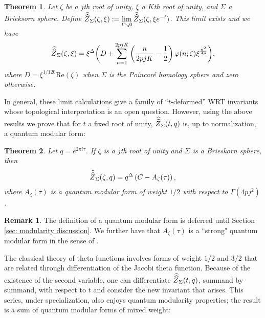 \documentclass[11pt,letterpaper]{amsart}
\newtheorem{theorem}{Theorem}[section]
\theoremstyle{definition}
\newtheorem*{remark}{Remark}
\theoremstyle{plain}
\newcommand{\Zhathat}{\widehat{\vphantom{\rule{5pt}{10pt}}\smash{\widehat{Z}}\,}\!}
\numberwithin{equation}{section}
\theoremstyle{example}
\begin{document}
\begin{theorem} \label{thm: radial limits} Let $\zeta$ be a $j$th root of unity, $\xi$ a $K$th root of unity, and $\Sigma$ a Brieksorn sphere. Define $\Zhathat_\Sigma(\zeta,\xi) := \displaystyle{\lim_{{t \searrow 0}} \Zhathat_\Sigma(\zeta,\xi e^{-t})}$. This limit exists and we have
\[\Zhathat_\Sigma(\zeta,\xi) = \xi^\Delta \bigg( D + \sum_{n=1}^{2pjK} \left(\frac{n}{2pjK}-\frac{1}{2} \right) \varphi(n;\zeta)\xi^{\frac{n^2}{4p}} \bigg),\]
where $D=\xi^{1/120}\text{Re}(\zeta)$ when $\Sigma$ is the Poincar\'e homology sphere and zero otherwise. 
\end{theorem}

In general, these limit calculations give a family of ``$t$-deformed'' WRT invariants whose topological interpretation is an open question. However, using the above results we prove that for $t$ a fixed root of unity, $\Zhathat_{\Sigma}(t,q)$ is, up to normalization, a quantum modular form:

\begin{theorem} \label{thm:modularity} Let $q = e^{2\pi i \tau}$. If $\zeta$ is a $j$th root of unity and $\Sigma$ is a Brieskorn sphere, then
\[\Zhathat_\Sigma(\zeta,q)  = q^\Delta\left(C - A_\zeta(\tau)\right), \]
where $A_\zeta(\tau)$ is a quantum modular form of weight $1/2$ with respect to $\Gamma(4pj^2)$.
\end{theorem}

\begin{remark}
 The definition of a quantum modular form is deferred until Section \ref{sec: modularity discussion}. 
We further have that $A_\zeta(\tau)$ is a ``strong" quantum modular form in the sense of \cite{zagier}.
\end{remark}

The classical theory of theta functions involves forms of weight $1/2$ and $3/2$ that are related through differentiation of the Jacobi theta function.
Because of the existence of the second variable, one can differentiate $\Zhathat_\Sigma(t,q)$, summand by summand, with respect to $t$ and consider the new invariant that arises. This series, under specialization, also enjoys quantum modularity properties; the result is a sum of quantum modular forms of mixed weight:
\end{document}
